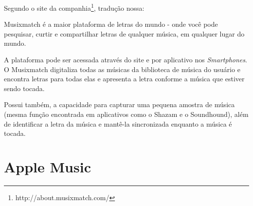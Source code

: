 Segundo o site da companhia\footnote{http://about.musixmatch.com/}, tradução nossa:

\begin{citation}
Musixmatch é a maior plataforma de letras do mundo - onde você pode pesquisar, curtir e compartilhar letras de qualquer música, em qualquer lugar do mundo.
\end{citation}

A plataforma pode ser acessada através do site e por aplicativo nos \textit{Smartphones}. O Musixmatch digitaliza todas as músicas da biblioteca de música do usuário e encontra letras para todas elas e apresenta a letra conforme a música que estiver sendo tocada. 

Possui também, a capacidade para capturar uma pequena amostra de música (mesma função encontrada em aplicativos como o Shazam e o Soundhound), além de identificar a letra da música e mantê-la sincronizada enquanto a música é tocada.


\section{Apple Music}

